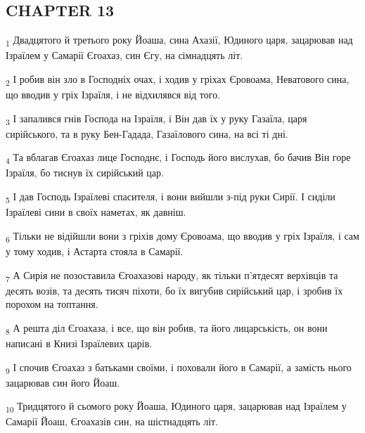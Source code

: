 \subsection{CHAPTER 13}
\begin{tcolorbox}
\textsubscript{1} Двадцятого й третього року Йоаша, сина Ахазії, Юдиного царя, зацарював над Ізраїлем у Самарії Єгоахаз, син Єгу, на сімнадцять літ.
\end{tcolorbox}
\begin{tcolorbox}
\textsubscript{2} І робив він зло в Господніх очах, і ходив у гріхах Єровоама, Неватового сина, що вводив у гріх Ізраїля, і не відхилявся від того.
\end{tcolorbox}
\begin{tcolorbox}
\textsubscript{3} І запалився гнів Господа на Ізраїля, і Він дав їх у руку Газаїла, царя сирійського, та в руку Бен-Гадада, Газаїлового сина, на всі ті дні.
\end{tcolorbox}
\begin{tcolorbox}
\textsubscript{4} Та вблагав Єгоахаз лице Господнє, і Господь його вислухав, бо бачив Він горе Ізраїля, бо тиснув їх сирійський цар.
\end{tcolorbox}
\begin{tcolorbox}
\textsubscript{5} І дав Господь Ізраїлеві спасителя, і вони вийшли з-під руки Сирії. І сиділи Ізраїлеві сини в своїх наметах, як давніш.
\end{tcolorbox}
\begin{tcolorbox}
\textsubscript{6} Тільки не відійшли вони з гріхів дому Єровоама, що вводив у гріх Ізраїля, і сам у тому ходив, і Астарта стояла в Самарії.
\end{tcolorbox}
\begin{tcolorbox}
\textsubscript{7} А Сирія не позоставила Єгоахазові народу, як тільки п'ятдесят верхівців та десять возів, та десять тисяч піхоти, бо їх вигубив сирійський цар, і зробив їх порохом на топтання.
\end{tcolorbox}
\begin{tcolorbox}
\textsubscript{8} А решта діл Єгоахаза, і все, що він робив, та його лицарськість, он вони написані в Книзі Ізраїлевих царів.
\end{tcolorbox}
\begin{tcolorbox}
\textsubscript{9} І спочив Єгоахаз з батьками своїми, і поховали його в Самарії, а замість нього зацарював син його Йоаш.
\end{tcolorbox}
\begin{tcolorbox}
\textsubscript{10} Тридцятого й сьомого року Йоаша, Юдиного царя, зацарював над Ізраїлем у Самарії Йоаш, Єгоахазів син, на шістнадцять літ.
\end{tcolorbox}
